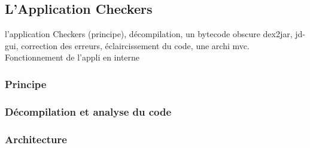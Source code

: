 
\subsection{L'Application Checkers}

l'application Checkers (principe), décompilation, un bytecode obscure
dex2jar, jd-gui, correction des erreurs, éclaircissement du code, une archi mvc.
Fonctionnement de l'appli en interne
\subsubsection{Principe}
\subsubsection{Décompilation et analyse du code}
\subsubsection{Architecture}